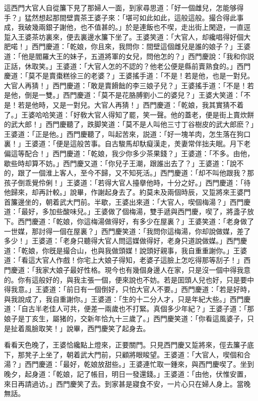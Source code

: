 這西門大官人自從簾下見了那婦人一面，到家尋思道：「好一個雌兒，怎能够得手？」猛然想起那間壁賣茶王婆子來：「堪可如此如此，這般這般。撮合得此事成，我破幾兩銀子謝他，也不值甚的。」於是連飯也不喫，走出街上閑遊，一直逕踅入王婆茶坊裏來，便去裏邊水簾下坐了。王婆笑道：「大官人，却纔唱得好個大肥喏！」西門慶道：「乾娘，你且來，我問你：間壁這個雌兒是誰的娘子？」王婆道：「他是閻羅大王的妹子，五道將軍的女兒，問他怎的？」西門慶說：「我和你説正話，休取笑。」王婆道：「大官人怎的不認的？他老公便是縣前賣熟食的。」西門慶道：「莫不是賣棗糕徐三的老婆？」王婆搖手道：「不是！若是他，也是一對兒。大官人再猜！」西門慶道：「敢是賣餶飿的李三娘子兒？」王婆搖手道：「不是！若是他，倒是一雙。」西門慶道：「莫不是花胳膊劉小二的婆兒？」王婆大笑道：「不是！若是他時，又是一對兒。大官人再猜！」西門慶道：「乾娘，我其實猜不着了。」王婆哈哈笑道：「好敎大官人得知了罷，笑一聲。他的蓋老，便是街上賣炊餅的武大郎！」西門慶聽了，跌脚笑道：「莫不是人叫他三寸丁谷樹皮的武大郎麽？」王婆道：「正是他。」西門慶聽了，叫起苦來，説道：「好一塊羊肉，怎生落在狗口裏！」王婆道：「便是這般苦事。自古駿馬却馱癡漢走，羙妻常伴拙夫眠。月下老偏這等配合！」西門慶道：「乾娘，我少你多少茶果錢？」王婆道：「不多。由他，歇些時却算不妨。」西門慶又道：「你兒子王潮，跟誰出去了？」王婆道：「說不的，跟了一個淮上客人，至今不歸，又不知死活。」西門慶道：「却不叫他跟我？那孩子倒乖覺伶俐！」王婆道：「若得大官人擡擧他時，十分之好。」西門慶道：「待他歸來，却再計較。」說畢，作謝起身去了。約莫未及兩個時辰，又踅將來王婆門首簾邊坐的，朝着武大門前。半歇，王婆出來道：「大官人，喫個梅湯？」西門慶道：「最好，多加些酸味兒。」王婆做了個梅湯，雙手遞與西門慶，喫了，將盞子放下。西門慶道：「乾娘，你這梅湯做得好，有多少在屋裏？」王婆笑道：「老身做了一世媒，那討得一個在屋裏？」西門慶笑道：「我問你這梅湯，你却說做媒，差了多少！」王婆道：「老身只聽得大官人問這媒做得好，老身只道說做媒。」西門慶道：「乾娘，你旣是撮合山，也與我做頭媒！說頭好親事，我自重重謝你。」王婆道：「看這大官人作戲！你宅上大娘子得知，老婆子這臉上怎吃得那等刮子！」西門慶道：「我家大娘子最好性格。現今也有幾個身邊人在家，只是沒一個中得我意的。你有這般好的，與我主張一個，便來說也不妨。若是囬頭人兒也好，只是要中得我意。」王婆道：「前日有一個倒好，只怕大官人不要。」西門慶道：「若是好時，與我說成了，我自重謝你。」王婆道：「生的十二分人才，只是年紀大些。」西門慶道：「自古半老佳人可共，便差一兩歲也不打緊。真個多少年紀？」王婆子道：「那娘子是丁亥生，屬猪的，交新年恰九十三歲了。」西門慶笑道：「你看這風婆子，只是扯着風臉取笑！」說畢，西門慶笑了起身去。

看看天色晚了，王婆恰纔點上燈來，正要關門。只見西門慶又踅將來，俓去簾子底下，那凳子上坐了，朝着武大門前，只顧將眼睃望。王婆道：「大官人，喫個和合湯？」西門慶道：「最好，乾娘放甜些。」王婆連忙取一鍾來，與西門慶喫了。坐到晚夕，起身道：「乾娘，記了帳目，明日一發還錢。」王婆道：「由他，伏惟安置，來日再請過访。」西門慶笑了去。到家甚是寢食不安，一片心只在婦人身上。當晚無話。

